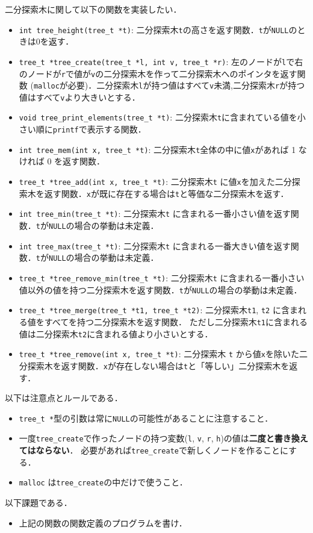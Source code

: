 \documentclass[a4paper,twoside,onecolumn,openany,article]{memoir}
\theoremstyle{remark}
\begin{document}
二分探索木に関して以下の関数を実装したい．
\begin{itemize}
\item \texttt{int tree\_height(tree\_t *t)}: 二分探索木\texttt{t}の高さを返す関数．\texttt{t}が\texttt{NULL}のときは0を返す．
\item \texttt{tree\_t *tree\_create(tree\_t *l, int v, tree\_t *r)}: 左のノードが\texttt{l}で右のノードが\texttt{r}で値が\texttt{v}の二分探索木を作って二分探索木へのポインタを返す関数
(\texttt{malloc}が必要)．二分探索木\texttt{l}が持つ値はすべて\texttt{v}未満,二分探索木\texttt{r}が持つ値はすべて\texttt{v}より大きいとする．
\item \texttt{void tree\_print\_elements(tree\_t *t)}: 二分探索木\texttt{t}に含まれている値を小さい順に\texttt{printf}で表示する関数．
\item \texttt{int tree\_mem(int x, tree\_t *t)}: 二分探索木\texttt{t}全体の中に値\texttt{x}があれば 1 なければ 0 を返す関数．
\item \texttt{tree\_t *tree\_add(int x, tree\_t *t)}: 二分探索木\texttt{t} に値\texttt{x}を加えた二分探索木を返す関数．\texttt{x}が既に存在する場合は\texttt{t}と等価な二分探索木を返す．
\item \texttt{int tree\_min(tree\_t *t)}: 二分探索木\texttt{t} に含まれる一番小さい値を返す関数．\texttt{t}が\texttt{NULL}の場合の挙動は未定義．
\item \texttt{int tree\_max(tree\_t *t)}: 二分探索木\texttt{t} に含まれる一番大きい値を返す関数．\texttt{t}が\texttt{NULL}の場合の挙動は未定義．
\item \texttt{tree\_t *tree\_remove\_min(tree\_t *t)}: 二分探索木\texttt{t} に含まれる一番小さい値以外の値を持つ二分探索木を返す関数．\texttt{t}が\texttt{NULL}の場合の挙動は未定義．
\item \texttt{tree\_t *tree\_merge(tree\_t *t1, tree\_t *t2)}: 二分探索木\texttt{t1}, \texttt{t2} に含まれる値をすべてを持つ二分探索木を返す関数．
ただし二分探索木\texttt{t1}に含まれる値は二分探索木\texttt{t2}に含まれる値より小さいとする．
\item \texttt{tree\_t *tree\_remove(int x, tree\_t *t)}: 二分探索木 \texttt{t} から値\texttt{x}を除いた二分探索木を返す関数．\texttt{x}が存在しない場合は\texttt{t}と「等しい」二分探索木を返す．
\end{itemize}
以下は注意点とルールである．
\begin{itemize}
\item \texttt{tree\_t *}型の引数は常に\texttt{NULL}の可能性があることに注意すること．
\item 一度\texttt{tree\_create}で作ったノードの持つ変数(\texttt{l}, \texttt{v}, \texttt{r}, \texttt{h})の値は\textbf{二度と書き換えてはならない}．
必要があれば\texttt{tree\_create}で新しくノードを作ることにする．
\item \texttt{malloc} は\texttt{tree\_create}の中だけで使うこと．
\end{itemize}
以下課題である．
\begin{itemize}
\item 上記の関数の関数定義のプログラムを書け．
\end{itemize}
\end{document}
